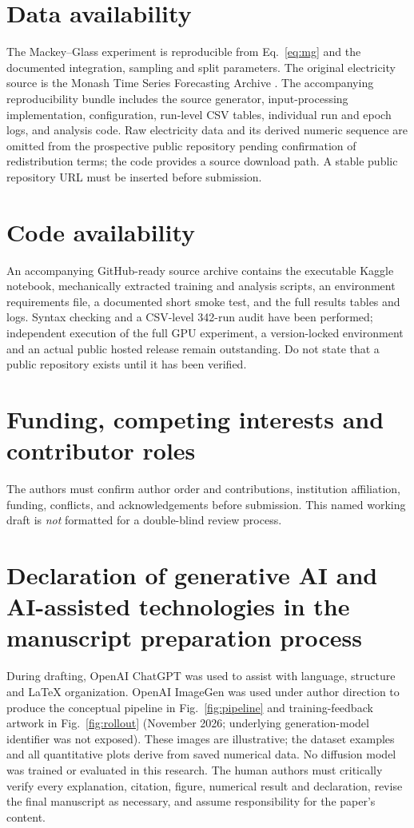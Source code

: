 \documentclass[final,5p,times,twocolumn]{elsarticle}
\begin{document}
\section*{Data availability}
The Mackey--Glass experiment is reproducible from Eq.~\ref{eq:mg} and the documented integration, sampling and split parameters. The original electricity source is the Monash Time Series Forecasting Archive \cite{godahewa2021monash}. The accompanying reproducibility bundle includes the source generator, input-processing implementation, configuration, run-level CSV tables, individual run and epoch logs, and analysis code. Raw electricity data and its derived numeric sequence are omitted from the prospective public repository pending confirmation of redistribution terms; the code provides a source download path. A stable public repository URL must be inserted before submission.

\section*{Code availability}
An accompanying GitHub-ready source archive contains the executable Kaggle notebook, mechanically extracted training and analysis scripts, an environment requirements file, a documented short smoke test, and the full results tables and logs. Syntax checking and a CSV-level 342-run audit have been performed; independent execution of the full GPU experiment, a version-locked environment and an actual public hosted release remain outstanding. Do not state that a public repository exists until it has been verified.

\section*{Funding, competing interests and contributor roles}
The authors must confirm author order and contributions, institution affiliation, funding, conflicts, and acknowledgements before submission. This named working draft is \emph{not} formatted for a double-blind review process.

\section*{Declaration of generative AI and AI-assisted technologies in the manuscript preparation process}
During drafting, OpenAI ChatGPT was used to assist with language, structure and LaTeX organization. OpenAI ImageGen was used under author direction to produce the conceptual pipeline in Fig.~\ref{fig:pipeline} and training-feedback artwork in Fig.~\ref{fig:rollout} (November 2026; underlying generation-model identifier was not exposed). These images are illustrative; the dataset examples and all quantitative plots derive from saved numerical data. No diffusion model was trained or evaluated in this research. The human authors must critically verify every explanation, citation, figure, numerical result and declaration, revise the final manuscript as necessary, and assume responsibility for the paper's content.



\end{document}

